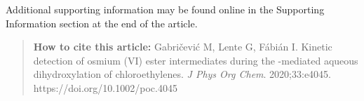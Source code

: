 \documentclass{article}
\begin{document}
Additional supporting information may be found online in the Supporting Information section at the end of the article.

\begin{quote}
\noindent\textbf{How to cite this article:} Gabričević M, Lente G, Fábián I. Kinetic detection of osmium (VI) ester intermediates during the -mediated aqueous dihydroxylation of chloroethylenes. \emph{J Phys Org Chem}. 2020;33:e4045. https://doi.org/10.1002/poc.4045
\end{quote}
\end{document}
